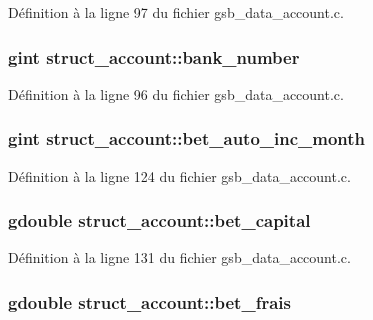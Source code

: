 Définition à la ligne 97 du fichier gsb\_\-data\_\-account.c.

\subsubsection[{bank\_\-number}]{\setlength{\rightskip}{0pt plus 5cm}gint {\bf struct\_\-account::bank\_\-number}}\label{structstruct__account_a426c8e858a0afcb0b8ddee071edbfdb4}


Définition à la ligne 96 du fichier gsb\_\-data\_\-account.c.

\subsubsection[{bet\_\-auto\_\-inc\_\-month}]{\setlength{\rightskip}{0pt plus 5cm}gint {\bf struct\_\-account::bet\_\-auto\_\-inc\_\-month}}\label{structstruct__account_aa2daf608e9a89e41950e64d2476176d6}


Définition à la ligne 124 du fichier gsb\_\-data\_\-account.c.

\subsubsection[{bet\_\-capital}]{\setlength{\rightskip}{0pt plus 5cm}gdouble {\bf struct\_\-account::bet\_\-capital}}\label{structstruct__account_a717254181bf1ee01cfdd636d34ba76c3}


Définition à la ligne 131 du fichier gsb\_\-data\_\-account.c.

\subsubsection[{bet\_\-frais}]{\setlength{\rightskip}{0pt plus 5cm}gdouble {\bf struct\_\-account::bet\_\-frais}}\label{structstruct__account_a7783cfb9f38f5b1b67ba2ec114b4bc85}


